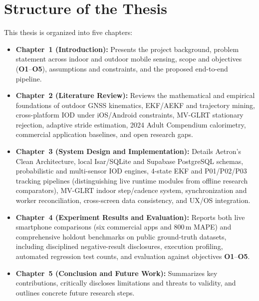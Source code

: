 \section{Structure of the Thesis}
This thesis is organized into five chapters:
\begin{itemize}
    \item \textbf{Chapter~1 (Introduction):} Presents the project background, problem statement across indoor and outdoor mobile sensing, scope and objectives (\textbf{O1}--\textbf{O5}), assumptions and constraints, and the proposed end-to-end pipeline.
    \item \textbf{Chapter~2 (Literature Review):} Reviews the mathematical and empirical foundations of outdoor GNSS kinematics, EKF/AEKF and trajectory mining, cross-platform IOD under iOS/Android constraints, MV-GLRT stationary rejection, adaptive stride estimation, 2024 Adult Compendium calorimetry, commercial application baselines, and open research gaps.
    \item \textbf{Chapter~3 (System Design and Implementation):} Details Aetron's Clean Architecture, local Isar/SQLite and Supabase PostgreSQL schemas, probabilistic and multi-sensor IOD engines, 4-state EKF and P01/P02/P03 tracking pipelines (distinguishing live runtime modules from offline research comparators), MV-GLRT indoor step/cadence system, synchronization and worker reconciliation, cross-screen data consistency, and UX/OS integration.
    \item \textbf{Chapter~4 (Experiment Results and Evaluation):} Reports both live smartphone comparisons (six commercial apps and $800$\,m MAPE) and comprehensive holdout benchmarks on public ground-truth datasets, including disciplined negative-result disclosures, execution profiling, automated regression test counts, and evaluation against objectives \textbf{O1}--\textbf{O5}.
    \item \textbf{Chapter~5 (Conclusion and Future Work):} Summarizes key contributions, critically discloses limitations and threats to validity, and outlines concrete future research steps.
\end{itemize}
